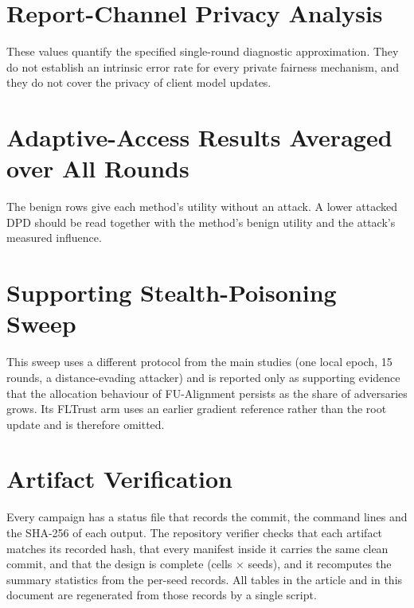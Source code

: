 \documentclass[pdflatex,sn-mathphys-num]{sn-jnl}
\begin{document}
\section{Report-Channel Privacy Analysis}
\label{sec:si_privacy}




These values quantify the specified single-round diagnostic approximation. They do not establish an intrinsic error rate for every private fairness mechanism, and they do not cover the privacy of client model updates.

\clearpage
\section{Adaptive-Access Results Averaged over All Rounds}
\label{sec:si_c24}


The benign rows give each method's utility without an attack. A lower attacked DPD should be read together with the method's benign utility and the attack's measured influence.

\section{Supporting Stealth-Poisoning Sweep}
\label{sec:si_c05}


This sweep uses a different protocol from the main studies (one local epoch, 15 rounds, a distance-evading attacker) and is reported only as supporting evidence that the allocation behaviour of FU-Alignment persists as the share of adversaries grows. Its FLTrust arm uses an earlier gradient reference rather than the root update and is therefore omitted.

\section{Artifact Verification}
\label{sec:si_verification}
Every campaign has a status file that records the commit, the command lines and the SHA-256 of each output. The repository verifier checks that each artifact matches its recorded hash, that every manifest inside it carries the same clean commit, and that the design is complete (cells $\times$ seeds), and it recomputes the summary statistics from the per-seed records. All tables in the article and in this document are regenerated from those records by a single script.


\end{document}
